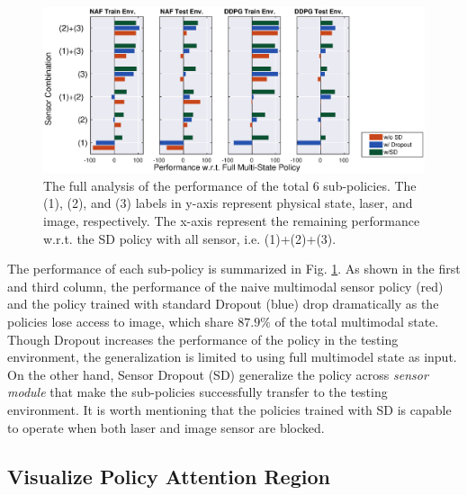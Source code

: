 \documentclass[../thesis.tex]{subfiles}
\begin{document}
\begin{figure}[t]
\vskip -0.1in
\centering
\includegraphics[width=\columnwidth]{./MultimodalDRL/fig/all_policy}
\caption{The full analysis of the performance of the total $6$ sub-policies. The (1), (2), and (3) labels in y-axis represent physical state, laser, and image, respectively. The x-axis represent the remaining performance w.r.t. the SD policy with all sensor, i.e. (1)+(2)+(3).}
\label{fig:full-sd-policy}
\vskip -0.1in
\end{figure} 

The performance of each sub-policy is summarized in Fig. \ref{fig:full-sd-policy}. 
As shown in the first and third column, the performance of the naive multimodal sensor policy (red) and the policy trained with standard Dropout (blue) drop dramatically as the policies lose access to image, which share $87.9\%$ of the total multimodal state. Though Dropout increases the performance of the policy in the testing environment, the generalization is limited to using full multimodel state  as input. On the other hand, Sensor Dropout (SD) generalize the policy across \textit{sensor module} that make the sub-policies successfully transfer to the testing environment. It is worth mentioning that the policies trained with SD is capable to operate when both laser and image sensor are blocked.


\subsection{Visualize Policy Attention Region}
\end{document}
